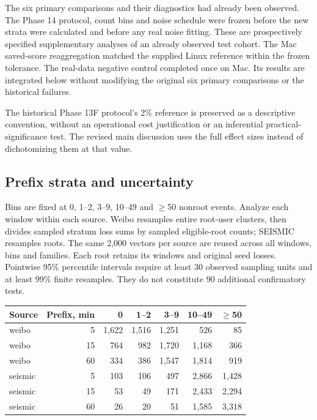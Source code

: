 The six primary comparisons and their diagnostics had already been observed. The Phase 14 protocol, count bins and noise schedule were frozen before the new strata were calculated and before any real noise fitting. These are prospectively specified supplementary analyses of an already observed test cohort. The Mac saved-score reaggregation matched the supplied Linux reference within the frozen tolerance. The real-data negative control completed once on Mac. Its results are integrated below without modifying the original six primary comparisons or the historical failures.

The historical Phase 13F protocol's 2\% reference is preserved as a descriptive convention, without an operational cost justification or an inferential practical-significance test. The revised main discussion uses the full effect sizes instead of dichotomizing them at that value.

\hypertarget{prefix-strata-and-uncertainty}{%
\subsection{Prefix strata and uncertainty}\label{prefix-strata-and-uncertainty}}

Bins are fixed at 0, 1--2, 3--9, 10--49 and \ensuremath{\geq}50 nonroot events. Analyze each window within each source. Weibo resamples entire root-user clusters, then divides sampled stratum loss sums by sampled eligible-root counts; SEISMIC resamples roots. The same 2,000 vectors per source are reused across all windows, bins and families. Each root retains its windows and original seed losses. Pointwise 95\% percentile intervals require at least 30 observed sampling units and at least 99\% finite resamples. They do not constitute 90 additional confirmatory tests.

\small\begin{longtable}[]{@{}lrrrrrr@{}}
\toprule\noalign{}
Source & Prefix, min & 0 & 1--2 & 3--9 & 10--49 & \ensuremath{\geq}50 \\
\midrule\noalign{}
\endhead
\bottomrule\noalign{}
\endlastfoot
weibo & 5 & 1,622 & 1,516 & 1,251 & 526 & 85 \\
weibo & 15 & 764 & 982 & 1,720 & 1,168 & 366 \\
weibo & 60 & 334 & 386 & 1,547 & 1,814 & 919 \\
seismic & 5 & 103 & 106 & 497 & 2,866 & 1,428 \\
seismic & 15 & 53 & 49 & 171 & 2,433 & 2,294 \\
seismic & 60 & 26 & 20 & 51 & 1,585 & 3,318 \\
\end{longtable}\normalsize

